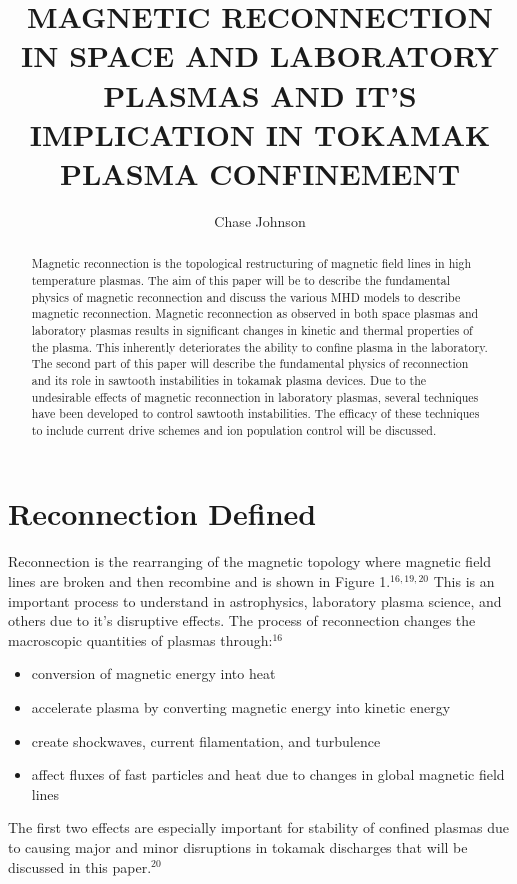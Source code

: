 \documentclass{article}
\begin{document}
\title{MAGNETIC RECONNECTION IN SPACE AND LABORATORY PLASMAS AND IT’S IMPLICATION IN TOKAMAK PLASMA CONFINEMENT}
\author{Chase Johnson}
\maketitle
\begin{abstract}
Magnetic reconnection is the topological restructuring of magnetic field lines in high temperature plasmas.    The aim of this paper will be to describe the fundamental physics of magnetic reconnection and discuss the various MHD models to describe magnetic reconnection.  Magnetic reconnection as observed in both space plasmas and laboratory plasmas results in significant changes in kinetic and thermal properties of the plasma.  This inherently deteriorates the ability to confine plasma in the laboratory.  The second part of this paper will describe the fundamental physics of reconnection and its role in sawtooth instabilities in tokamak plasma devices.  Due to the undesirable effects of magnetic reconnection in laboratory plasmas, several techniques have been developed to control sawtooth instabilities.  The efficacy of these techniques to include current drive schemes and ion population control will be discussed.
\end{abstract}
\section{Reconnection Defined}
Reconnection is the rearranging of the magnetic topology where magnetic field lines are broken and then recombine and is shown in Figure 1.$^{16,19,20}$  This is an important process to understand in astrophysics, laboratory plasma science, and others due to it's disruptive effects.  The process of reconnection changes the macroscopic quantities of plasmas through:$^{16}$
\begin{itemize}
\item conversion of magnetic energy into heat
\item accelerate plasma by converting magnetic energy into kinetic energy
\item create shockwaves, current filamentation, and turbulence
\item affect fluxes of fast particles and heat due to changes in global magnetic field lines
\end{itemize}
The first two effects are especially important for stability of confined plasmas due to causing major and minor disruptions in tokamak discharges that will be discussed in this paper.$^{20}$
\begin{SCfigure}
  \centering
\end{SCfigure}
\end{document}
